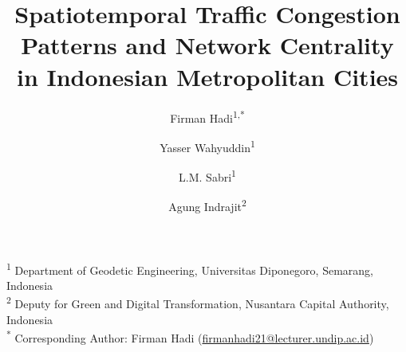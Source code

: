 \documentclass[12pt,a4paper]{article}
\title{Spatiotemporal Traffic Congestion Patterns and Network Centrality in Indonesian Metropolitan Cities}
\author{%
  Firman Hadi\textsuperscript{1,*} \and
  Yasser Wahyuddin\textsuperscript{1} \and
  L.M. Sabri\textsuperscript{1} \and
  Agung Indrajit\textsuperscript{2}%
}
\date{}
\begin{document}
\maketitle

\noindent\textsuperscript{1} Department of Geodetic Engineering, Universitas Diponegoro, Semarang, Indonesia\\
\textsuperscript{2} Deputy for Green and Digital Transformation, Nusantara Capital Authority, Indonesia\\[6pt]
\textsuperscript{*} Corresponding Author: Firman Hadi (\href{mailto:firmanhadi21@lecturer.undip.ac.id}{firmanhadi21@lecturer.undip.ac.id})

\bigskip

\end{document}
